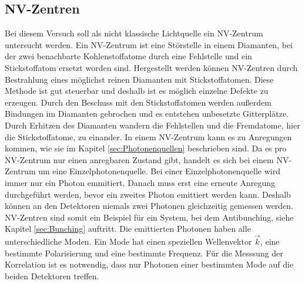 \subsection{NV-Zentren}
Bei diesem Versuch soll als nicht klassische Lichtquelle ein NV-Zentrum untersucht werden. Ein NV-Zentrum ist eine Störstelle in einem Diamanten, bei der zwei benachbarte Kohlenstoffatome durch eine Fehlstelle und ein Stickstoffatom ersetzt worden sind.  
Hergestellt werden können NV-Zentren durch Bestrahlung eines möglichst reinen Diamanten mit Stickstoffatomen. Diese Methode ist gut steuerbar und deshalb ist es möglich einzelne Defekte zu erzeugen. Durch den Beschuss mit den Stickstoffatomen werden außerdem Bindungen im Diamanten gebrochen und es entstehen unbesetzte Gitterplätze. Durch Erhitzen des Diamanten wandern die Fehlstellen und die Fremdatome, hier die Stickstoffatome, zu einander.  
In einem NV-Zentrum kann es zu Anregungen kommen, wie sie im Kapitel \ref{sec:Photonenquellen} beschrieben sind. Da es pro NV-Zentrum nur einen anregbaren Zustand gibt, handelt es sich bei einem NV-Zentrum um eine Einzelphotonenquelle.   Bei einer Einzelphotonenquelle wird immer nur ein Photon emmitiert. Danach muss erst eine erneute Anregung durchgeführt werden, bevor ein zweites Photon emittiert werden kann. Deshalb können an den Detektoren niemals zwei Photonen gleichzeitig gemessen werden. NV-Zentren sind somit ein Beispiel für ein System, bei dem Antibunching, siehe Kapitel \ref{sec:Bunching}  auftritt.  
Die emittierten Photonen haben alle unterschiedliche Moden. Ein Mode hat  einen speziellen Wellenvektor $\vec{k}$, eine bestimmte Polarisierung und eine bestimmte Frequenz. Für die Messsung der Korrelation ist es notwendig, dass nur Photonen einer bestimmten Mode  auf die beiden Detektoren treffen.




